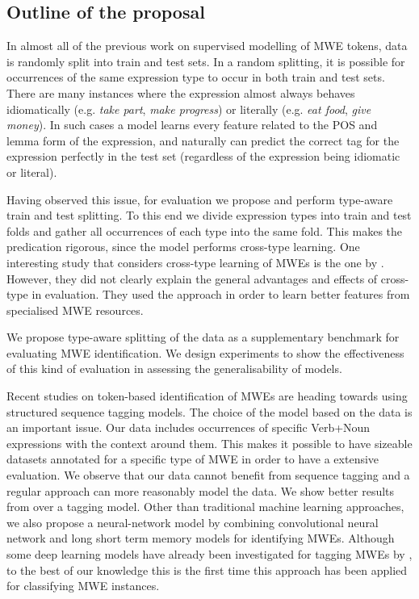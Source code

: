 \documentclass[output=paper,modfonts,nonflat]{langsci/langscibook}
\begin{document}
\subsection{Outline of the proposal}
\label{s:obs}

In almost all of the previous work on supervised modelling of MWE tokens, data is randomly split into train and test sets. %
In a random splitting, it is possible for occurrences of the same expression type to occur in both train and test sets. There are many instances where the expression almost always behaves idiomatically (e.g. \textit{take part}, \textit{make progress}) or literally (e.g. \textit{eat food}, \textit{give money}). In such cases a model learns every feature related to the POS and lemma form of the expression, and naturally can predict the correct tag for the expression perfectly in the test set (regardless of the expression being idiomatic or literal).  

Having observed this issue, for evaluation we propose and perform type-aware train and test splitting. To this end we divide expression types into train and test folds and gather all occurrences of each type into the same fold. This makes the predication rigorous, since the model performs cross-type learning.
One interesting study that considers cross-type learning of MWEs is the one by \cite{Fothergill2012}. However, they did not clearly explain %
the general advantages and effects of cross-type  in evaluation. They used the approach in order to learn better features from specialised MWE resources. 

We propose type-aware splitting of the data as a supplementary benchmark for evaluating MWE identification. We design experiments to show the effectiveness of this kind of evaluation in assessing the generalisability of models.

Recent studies on token-based identification of MWEs are heading towards using structured sequence tagging models. The choice of the model based on the data is an important issue. Our data includes occurrences of specific Verb+Noun expressions with the context around them. This makes it possible to have sizeable datasets annotated for a specific type of MWE in order to have a extensive evaluation.  
We observe that our data cannot benefit from sequence tagging and a regular  approach can more reasonably model the data. We show better results from  over a tagging model. 
Other than traditional machine learning  approaches, we also propose a neural-network model by combining convolutional neural network and long short term memory models for identifying MWEs. Although some deep learning models have already been investigated for tagging MWEs by \citet{Gharbieh2017}, to the best of our knowledge this is the first time this approach has been applied for classifying MWE instances. 
\end{document}
